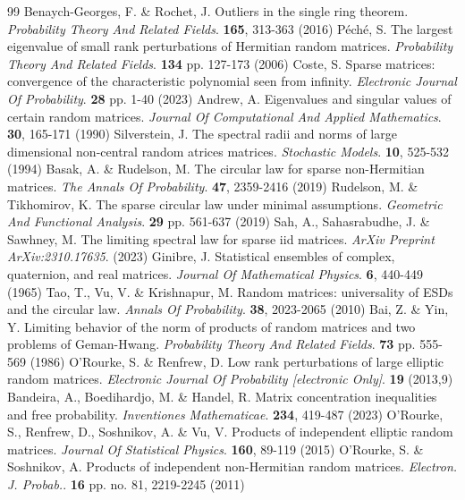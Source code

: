 \documentclass[12pt, reqno]{amsart}
\theoremstyle{definition}
\theoremstyle{remark}
\numberwithin{equation}{section}
\begin{document}
\begin{thebibliography}{99}
Benaych-Georges, F. \& Rochet, J. Outliers in the single ring theorem. {\em Probability Theory And Related Fields}. \textbf{165}, 313-363 (2016)
Péché, S. The largest eigenvalue of small rank perturbations of Hermitian random matrices. {\em Probability Theory And Related Fields}. \textbf{134} pp. 127-173 (2006)
Coste, S. Sparse matrices: convergence of the characteristic polynomial seen from infinity. {\em Electronic Journal Of Probability}. \textbf{28} pp. 1-40 (2023)
Andrew, A. Eigenvalues and singular values of certain random matrices. {\em Journal Of Computational And Applied Mathematics}. \textbf{30}, 165-171 (1990)
Silverstein, J. The spectral radii and norms of large dimensional non-central random atrices matrices. {\em Stochastic Models}. \textbf{10}, 525-532 (1994)
Basak, A. \& Rudelson, M. The circular law for sparse non-Hermitian matrices. {\em The Annals Of Probability}. \textbf{47}, 2359-2416 (2019)
Rudelson, M. \& Tikhomirov, K. The sparse circular law under minimal assumptions. {\em Geometric And Functional Analysis}. \textbf{29} pp. 561-637 (2019)
Sah, A., Sahasrabudhe, J. \& Sawhney, M. The limiting spectral law for sparse iid matrices. {\em ArXiv Preprint ArXiv:2310.17635}. (2023)
Ginibre, J. Statistical ensembles of complex, quaternion, and real matrices. {\em Journal Of Mathematical Physics}. \textbf{6}, 440-449 (1965)
Tao, T., Vu, V. \& Krishnapur, M. Random matrices: universality of ESDs and the circular law. {\em Annals Of Probability}. \textbf{38}, 2023-2065 (2010)
Bai, Z. \& Yin, Y. Limiting behavior of the norm of products of random matrices and two problems of Geman-Hwang. {\em Probability Theory And Related Fields}. \textbf{73} pp. 555-569 (1986)
O'Rourke, S. \& Renfrew, D. Low rank perturbations of large elliptic random matrices. {\em Electronic Journal Of Probability [electronic Only]}. \textbf{19} (2013,9)
Bandeira, A., Boedihardjo, M. \& Handel, R. Matrix concentration inequalities and free probability. {\em Inventiones Mathematicae}. \textbf{234}, 419-487 (2023)
O’Rourke, S., Renfrew, D., Soshnikov, A. \& Vu, V. Products of independent elliptic random matrices. {\em Journal Of Statistical Physics}. \textbf{160}, 89-119 (2015)
O'Rourke, S. \& Soshnikov, A. Products of independent non-Hermitian random matrices. {\em Electron. J. Probab.}. \textbf{16} pp. no. 81, 2219-2245 (2011)

\end{thebibliography}
\end{document}
